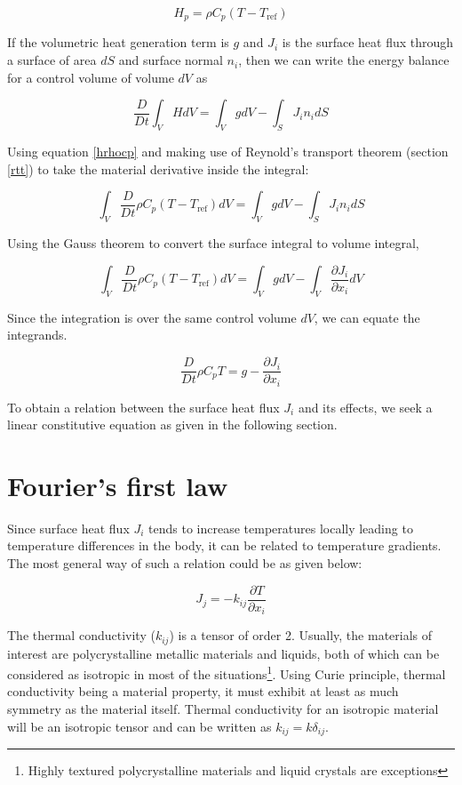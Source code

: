 \begin{equation}
H_p = \rho C_p (T - T_\text{ref})
\label{hrhocpa}
\end{equation}


If the volumetric heat generation term is $g$ and $J_i$ is the surface heat flux through a surface of area $dS$ and surface normal $n_i$, then we can write the energy balance for a control volume of volume $dV$ as

$$ \frac{D}{Dt} \int_V{H dV} = \int_{V}{g dV} - \int_{S}{ J_i n_i dS} $$

Using equation \ref{hrhocp} and making use of Reynold's transport theorem (section \ref{rtt}) to take the material derivative inside the integral: 

\begin{equation}
  \int_V{\frac{D}{Dt} \rho C_p (T - T_\text{ref}) dV} = \int_{V}{g dV} - \int_{S}{J_i n_i dS} 
\end{equation}

Using the Gauss theorem to convert the surface integral to volume integral,

\begin{equation}
  \int_V{\frac{D}{Dt} \rho C_p (T - T_\text{ref}) dV} = \int_{V}{g dV} - \int_{V}{\frac{\partial J_i}{\partial x_i} dV} 
\end{equation}


Since the integration is over the same control volume $dV$, we can equate the integrands.

\begin{equation}
\frac{D}{Dt} \rho C_p T = g - \frac{\partial J_i}{\partial x_i}
\label{ebalance}
\end{equation}

To obtain a relation between the surface heat flux $J_i$ and its effects, we seek a linear constitutive equation as given in the following section.

\section{Fourier's first law}

Since surface heat flux $J_i$ tends to increase temperatures locally leading to temperature differences in the body, it can be related to temperature gradients. The most general way of such a relation could be as given below:

$$ J_j = -k_{ij} \frac{\partial T}{\partial x_i} $$ 

The thermal conductivity ($k_{ij}$) is a tensor of order 2. Usually, the materials of interest are polycrystalline metallic materials and liquids, both of which can be considered as isotropic in most of the situations\footnote{Highly textured polycrystalline materials and liquid crystals are exceptions}. Using Curie principle, thermal conductivity being a material property, it must exhibit at least as much symmetry as the material itself. Thermal conductivity for an isotropic material will be an isotropic tensor and can be written as $k_{ij} = k \delta_{ij}$.

